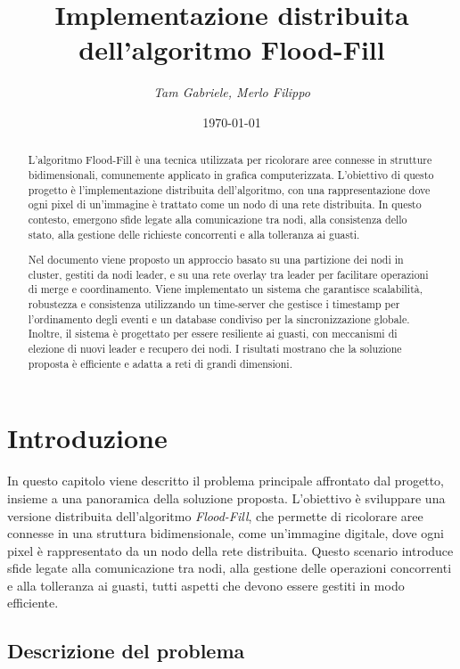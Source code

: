 \documentclass[12pt, a4paper]{report}
\title{\Huge{Implementazione distribuita dell'algoritmo Flood-Fill}}
\author{\Large{\textit{Tam Gabriele, Merlo Filippo}}}
\date{\today}
\begin{document}
\maketitle

\newpage
{}
\tableofcontents
\pagebreak

\begin{abstract} L'algoritmo Flood-Fill \`e una tecnica utilizzata per ricolorare aree connesse in strutture bidimensionali, comunemente applicato in grafica computerizzata. L'obiettivo di questo progetto \`e l'implementazione distribuita dell'algoritmo, con una rappresentazione dove ogni pixel di un'immagine \`e trattato come un nodo di una rete distribuita. In questo contesto, emergono sfide legate alla comunicazione tra nodi, alla consistenza dello stato, alla gestione delle richieste concorrenti e alla tolleranza ai guasti.

Nel documento viene proposto un approccio basato su una partizione dei nodi in cluster, gestiti da nodi leader, e su una rete overlay tra leader per facilitare operazioni di merge e coordinamento. Viene implementato un sistema che garantisce scalabilit\`a, robustezza e consistenza utilizzando un time-server che gestisce i timestamp per l'ordinamento degli eventi e un database condiviso per la sincronizzazione globale. Inoltre, il sistema \`e progettato per essere resiliente ai guasti, con meccanismi di elezione di nuovi leader e recupero dei nodi. I risultati mostrano che la soluzione proposta \`e efficiente e adatta a reti di grandi dimensioni. \end{abstract}

\chapter{Introduzione}

In questo capitolo viene descritto il problema principale affrontato dal progetto, insieme a una panoramica della soluzione proposta. L'obiettivo \`e sviluppare una versione distribuita dell'algoritmo \emph{Flood-Fill}, che permette di ricolorare aree connesse in una struttura bidimensionale, come un'immagine digitale, dove ogni pixel \`e rappresentato da un nodo della rete distribuita. Questo scenario introduce sfide legate alla comunicazione tra nodi, alla gestione delle operazioni concorrenti e alla tolleranza ai guasti, tutti aspetti che devono essere gestiti in modo efficiente.

\section{Descrizione del problema}
\end{document}
